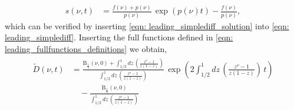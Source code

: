\documentclass[main.tex]{subfiles}
\begin{document}
\begin{align}\label{eqn: leading_simplediff_solution}
    s(\nu,t) &= \frac{f(\nu)+p(\nu)}{p(\nu)}\, \exp(p(\nu)t) - \frac{f(\nu)}{p(\nu)},
\end{align}
which can be verified by inserting \autoref{eqn: leading_simplediff_solution} into \autoref{eqn: leading_simplediff}. Inserting the full functions defined in \autoref{eqn: leading_fullfunctions_definitions} we obtain, 
\begin{align}\label{eqn: leading_vacuum_solution_mellinspace}
    \begin{split}
    \tilde{D}(\nu,t) &= \frac{\mathrm{B}_{\frac{1}{2}}(\nu,0)+\int_{1/2}^{1} dz \, \left( \frac{z^\nu-1}{z(1-z)}\right)}{\int_{1/2}^{1} dz \, \left( \frac{z^\nu-1}{z(1-z)}\right)}\, \exp(2\int_{1/2}^{1} dz \, \left( \frac{z^\nu-1}{z(1-z)}\right)\, t) \\
    &\quad - \frac{\mathrm{B}_{\frac{1}{2}}(\nu,0)}{\int_{1/2}^{1} dz \, \left( \frac{z^\nu-1}{z(1-z)}\right)}
    \end{split}
\end{align}
\end{document}

